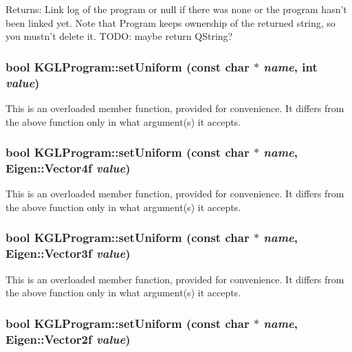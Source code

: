 \begin{Desc}
\item[Returns:]Link log of the program or null if there was none or the program hasn't been linked yet. Note that Program keeps ownership of the returned string, so you mustn't delete it. TODO: maybe return QString? \end{Desc}
\hypertarget{class_k_g_l_program_4d943d685f583e9a446d44689b6e7b0c}{
\subsubsection[{setUniform}]{\setlength{\rightskip}{0pt plus 5cm}bool KGLProgram::setUniform (const char $\ast$ {\em name}, \/  int {\em value})}}
\label{class_k_g_l_program_4d943d685f583e9a446d44689b6e7b0c}


This is an overloaded member function, provided for convenience. It differs from the above function only in what argument(s) it accepts. \hypertarget{class_k_g_l_program_b5a31ac9ea1f50767144233afaa0a9e3}{
\subsubsection[{setUniform}]{\setlength{\rightskip}{0pt plus 5cm}bool KGLProgram::setUniform (const char $\ast$ {\em name}, \/  Eigen::Vector4f {\em value})}}
\label{class_k_g_l_program_b5a31ac9ea1f50767144233afaa0a9e3}


This is an overloaded member function, provided for convenience. It differs from the above function only in what argument(s) it accepts. \hypertarget{class_k_g_l_program_e971d4c55c57ae853f4d1c8cdd8a22b9}{
\subsubsection[{setUniform}]{\setlength{\rightskip}{0pt plus 5cm}bool KGLProgram::setUniform (const char $\ast$ {\em name}, \/  Eigen::Vector3f {\em value})}}
\label{class_k_g_l_program_e971d4c55c57ae853f4d1c8cdd8a22b9}


This is an overloaded member function, provided for convenience. It differs from the above function only in what argument(s) it accepts. \hypertarget{class_k_g_l_program_a3213a9de09529704183cb61bec910d4}{
\subsubsection[{setUniform}]{\setlength{\rightskip}{0pt plus 5cm}bool KGLProgram::setUniform (const char $\ast$ {\em name}, \/  Eigen::Vector2f {\em value})}}
\label{class_k_g_l_program_a3213a9de09529704183cb61bec910d4}


